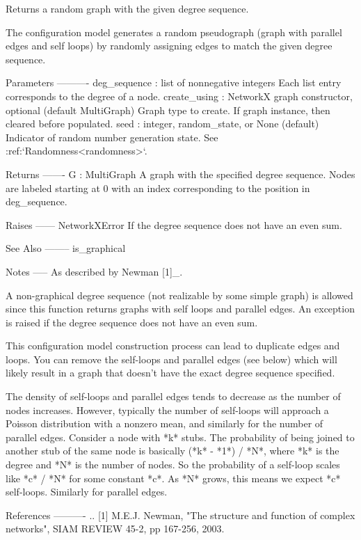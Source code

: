 \begin{DoxyVerb}Returns a random graph with the given degree sequence.

The configuration model generates a random pseudograph (graph with
parallel edges and self loops) by randomly assigning edges to
match the given degree sequence.

Parameters
----------
deg_sequence :  list of nonnegative integers
    Each list entry corresponds to the degree of a node.
create_using : NetworkX graph constructor, optional (default MultiGraph)
    Graph type to create. If graph instance, then cleared before populated.
seed : integer, random_state, or None (default)
    Indicator of random number generation state.
    See :ref:`Randomness<randomness>`.

Returns
-------
G : MultiGraph
    A graph with the specified degree sequence.
    Nodes are labeled starting at 0 with an index
    corresponding to the position in deg_sequence.

Raises
------
NetworkXError
    If the degree sequence does not have an even sum.

See Also
--------
is_graphical

Notes
-----
As described by Newman [1]_.

A non-graphical degree sequence (not realizable by some simple
graph) is allowed since this function returns graphs with self
loops and parallel edges.  An exception is raised if the degree
sequence does not have an even sum.

This configuration model construction process can lead to
duplicate edges and loops.  You can remove the self-loops and
parallel edges (see below) which will likely result in a graph
that doesn't have the exact degree sequence specified.

The density of self-loops and parallel edges tends to decrease as
the number of nodes increases. However, typically the number of
self-loops will approach a Poisson distribution with a nonzero mean,
and similarly for the number of parallel edges.  Consider a node
with *k* stubs. The probability of being joined to another stub of
the same node is basically (*k* - *1*) / *N*, where *k* is the
degree and *N* is the number of nodes. So the probability of a
self-loop scales like *c* / *N* for some constant *c*. As *N* grows,
this means we expect *c* self-loops. Similarly for parallel edges.

References
----------
.. [1] M.E.J. Newman, "The structure and function of complex networks",
   SIAM REVIEW 45-2, pp 167-256, 2003.


\end{DoxyVerb}
